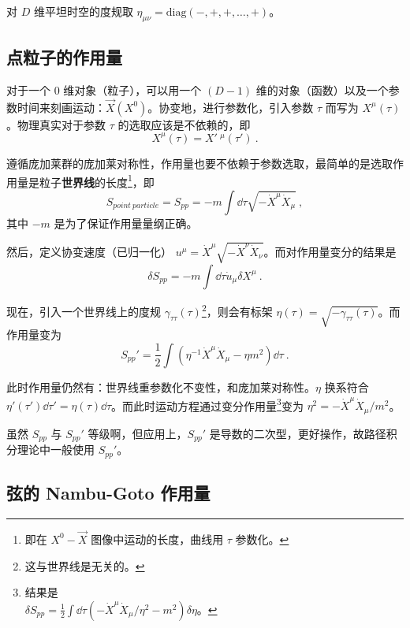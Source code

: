 
对 $D$ 维平坦时空的度规取 $\eta_{\mu\nu} = \text{diag}(-, +, +, \dots, +)$。
\subsection{点粒子的作用量}
对于一个 $0$ 维对象（粒子），可以用一个 $(D-1)$ 维的对象（函数）以及一个参数时间来刻画运动：$\vec X(X^0)$。协变地，进行参数化，引入参数 $\tau$ 而写为 $X^\mu(\tau)$。物理真实对于参数 $\tau$ 的选取应该是不依赖的，即
\begin{equation}
	X^\mu(\tau) = X'~^\mu(\tau') ~.
\end{equation}

遵循庞加莱群的庞加莱对称性，作用量也要不依赖于参数选取，最简单的是选取作用量是粒子\textbf{世界线}的长度\footnote{即在 $X^0-\vec X$ 图像中运动的长度，曲线用 $\tau$ 参数化。}，即 
\begin{equation}
	S_{point ~particle} = S_{pp} = -m \int \dd \tau \sqrt{- \dot X^\mu \dot X_\mu} ~,
\end{equation}
其中 $-m$ 是为了保证作用量量纲正确。

然后，定义协变速度（已归一化） $u^\mu = \dot X^\mu \sqrt{-\dot X^\nu \dot X_\nu}$。而对作用量变分的结果是 
\begin{equation}
	\delta S_{pp} = -m \int \dd \tau \dot u_{\mu} \delta X^\mu ~.
\end{equation}

现在，引入一个世界线上的度规 $\gamma_{\tau \tau}(\tau)$\footnote{这与世界线是无关的。}，则会有标架 $\eta(\tau) = \sqrt{- \gamma_{\tau \tau}(\tau)}$。而作用量变为
\begin{equation}
	S_{pp}' = \frac{1}{2} \int (\eta^{-1} \dot X^\mu \dot X_\mu - \eta m^2) \dd \tau ~.
\end{equation}

此时作用量仍然有：世界线重参数化不变性，和庞加莱对称性。$\eta$ 换系符合 $\eta'(\tau') \dd \tau' = \eta(\tau) \dd \tau$。而此时运动方程通过变分作用量\footnote{结果是 \\ $\delta S_{pp} = \frac{1}{2} \int \dd \tau (- \dot X^\mu \dot X_\mu/\eta^2 - m^2) \delta \eta$。}变为 $\eta^2 = -\dot X^\mu \dot X_\mu / m^2$。

虽然 $S_{pp}$ 与 $S_{pp}'$ 等级啊，但应用上，$S_{pp}'$ 是导数的二次型，更好操作，故路径积分理论中一般使用 $S_{pp}'$。

\subsection{弦的 Nambu-Goto 作用量}

